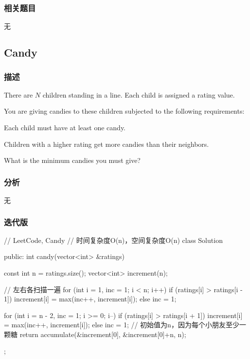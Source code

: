 \subsubsection{相关题目}
\begindot
\item 无
\myenddot


\subsection{Candy} %
\label{sec:candy}


\subsubsection{描述}
There are $N$ children standing in a line. Each child is assigned a rating value.

You are giving candies to these children subjected to the following requirements:
\begindot
\item Each child must have at least one candy.
\item Children with a higher rating get more candies than their neighbors.
\myenddot

What is the minimum candies you must give?


\subsubsection{分析}
无


\subsubsection{迭代版}
\begin{Code}
// LeetCode, Candy
// 时间复杂度O(n)，空间复杂度O(n)
class Solution {
public:
    int candy(vector<int> &ratings) {
        const int n = ratings.size();
        vector<int> increment(n);

        // 左右各扫描一遍
        for (int i = 1, inc = 1; i < n; i++) {
            if (ratings[i] > ratings[i - 1])
                increment[i] = max(inc++, increment[i]);
            else
                inc = 1;
        }

        for (int i = n - 2, inc = 1; i >= 0; i--) {
            if (ratings[i] > ratings[i + 1])
                increment[i] = max(inc++, increment[i]);
            else
                inc = 1;
        }
        // 初始值为n，因为每个小朋友至少一颗糖
        return accumulate(&increment[0], &increment[0]+n, n);
    }
};
\end{Code}


